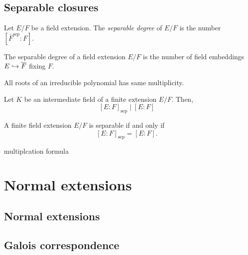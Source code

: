 \documentclass{../note}
\newcommand{\sep}{\mathrm{sep}}
\begin{document}
\section{Separable closures}



\begin{defn}
Let $E/F$ be a field extension.
The \emph{separable degree} of $E/F$ is the number $[\bar F^{\sep}:F]$.
\end{defn}



\begin{thm}
The separable degree of a field extension $E/F$ is the number of field embeddings $E\hookrightarrow\overline F$ fixing $F$.
\end{thm}

\begin{lem}
All roots of an irreducible polynomial has same multiplicity.
\end{lem}
\begin{pf}
\end{pf}

\begin{thm}
Let $K$ be an intermediate field of a finite extension $E/F$.
Then,
\[[E:F]_\sep\mid[E:F]\]
\end{thm}
\begin{pf}
\end{pf}

\begin{thm}
A finite field extension $E/F$ is separable if and only if
\[[E:F]_\sep=[E:F].\]
\end{thm}
\begin{pf}
\end{pf}


multiplcation formula













\chapter{Normal extensions}
\section{Normal extensions}
\section{Galois correspondence}
\end{document}

